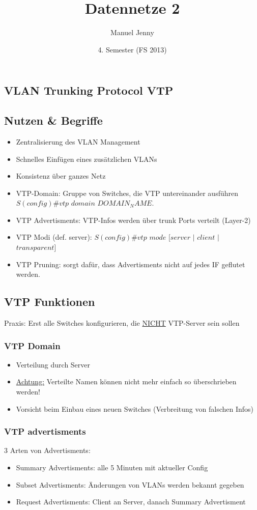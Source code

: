 \documentclass[landscape,twocolumn,a4paper]{article}
\title{
	\vspace{5cm}
	Datennetze 2
}
\author{Manuel Jenny}
\date{4. Semester (FS 2013)}
\begin{document}
\begin{footnotesize}
\section{VLAN Trunking Protocol VTP}

\subsection{Nutzen \& Begriffe}
\begin{itemize}
	\item Zentralisierung des VLAN Management
	\item Schnelles Einfügen eines zusätzlichen VLANs
	\item Konsistenz über ganzes Netz
	\item VTP-Domain: Gruppe von Switches, die VTP untereinander ausführen\\ $S(config)\#vtp$ $domain$ $DOMAIN_NAME$.
	\item VTP Advertisments: VTP-Infos werden über trunk Ports verteilt (Layer-2)
	\item VTP Modi (def. server): $S(config)\#vtp$ $mode$ $[server$ $|$ $client$ $|$ $transparent]$
	\item VTP Pruning: sorgt dafür, dass Advertisments nicht auf jedes IF geflutet werden.
\end{itemize}

\subsection{VTP Funktionen}
Praxis: Erst alle Switches konfigurieren, die \underline{NICHT} VTP-Server sein sollen\\

\subsubsection{VTP Domain}
\begin{itemize}
	\item Verteilung durch Server
	\item \underline{Achtung:} Verteilte Namen können nicht mehr einfach so überschrieben werden!
	\item Vorsicht beim Einbau eines neuen Switches (Verbreitung von falschen Infos)
\end{itemize}

\subsubsection{VTP advertisments}
3 Arten von Advertisments:
\vspace{-3mm}
\begin{itemize}
	\item Summary Advertisments: alle 5 Minuten mit aktueller Config
	\item Subset Advertisments: Änderungen von VLANs werden bekannt gegeben
	\item Request Advertisments: Client an Server, danach Summary Advertisment
\end{itemize}


\end{footnotesize}
\end{document}
